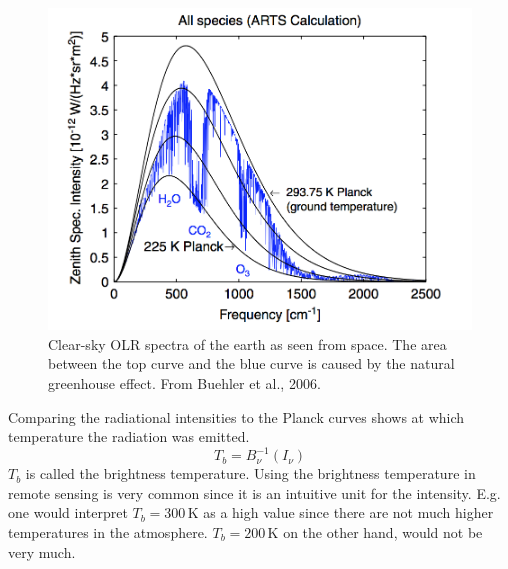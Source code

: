  \begin{figure}[h!]
\begin{center}
\includegraphics[width=1\textwidth]{figures/Buehler_et_al_OLR_spectra}
\caption{Clear-sky OLR spectra of the earth as seen from space. The area between the top curve and the blue curve is caused by the natural greenhouse effect. From Buehler et al., 2006.}
\label{Buehler_et_al_OLR_spectra}
\end{center}
\end{figure}

Comparing the radiational intensities to the Planck curves shows at which temperature the radiation was emitted. 
\begin{equation}
T_b = B^{-1}_{\nu}(I_{\nu})
\end{equation}
$T_b$ is called the brightness temperature. Using the brightness temperature in remote sensing is very common since it is an intuitive unit for the intensity. E.g. one would interpret $T_b = 300$\,K as a high value since there are not much higher temperatures in the atmosphere. $T_b = 200$\,K on the other hand, would not be very much.
 


